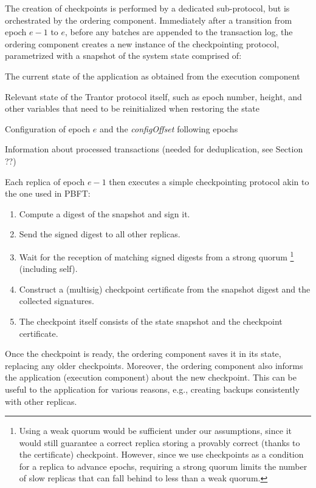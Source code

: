 \documentclass{article}
\begin{document}
The creation of checkpoints is performed by a dedicated sub-protocol, but is orchestrated by the ordering component.
Immediately after a transition from epoch $e-1$ to $e$, before any batches are appended to the transaction log,
the ordering component creates a new instance of the checkpointing protocol,
parametrized with a snapshot of the system state comprised of:
\begin{compactitem}
\item The current state of the application as obtained from the execution component
\item Relevant state of the Trantor protocol itself,
such as epoch number, height, and other variables that need to be reinitialized when restoring the state
\item Configuration of epoch $e$ and the \textit{configOffset} following epochs
\item Information about processed transactions (needed for deduplication, see Section ??)
\end{compactitem}
Each replica of epoch $e-1$ then executes a simple checkpointing protocol akin to the one used in PBFT:
\begin{enumerate}

\item Compute a digest of the snapshot and sign it.

\item Send the signed digest to all other replicas.

\item Wait for the reception of matching signed digests from a strong quorum%
\footnote{Using a weak quorum would be sufficient under our assumptions,
since it would still guarantee a correct replica storing a provably correct (thanks to the certificate) checkpoint.
However, since we use checkpoints as a condition for a replica to advance epochs,
requiring a strong quorum limits the number of slow replicas that can fall behind to less than a weak quorum.}
(including self).

\item Construct a (multisig) checkpoint certificate from the snapshot digest and the collected signatures.

\item The checkpoint itself consists of the state snapshot and the checkpoint certificate.

\end{enumerate}

Once the checkpoint is ready, the ordering component saves it in its state, replacing any older checkpoints.
Moreover, the ordering component also informs the application (execution component) about the new checkpoint.
This can be useful to the application for various reasons, e.g., creating backups consistently with other replicas.
\end{document}
